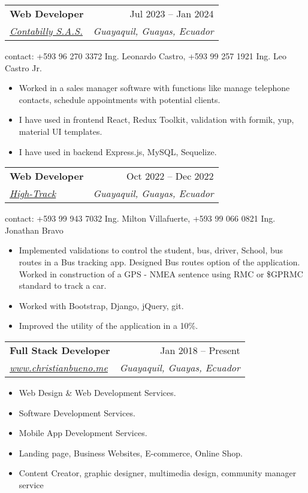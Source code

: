 \documentclass[a4paper,11pt]{article}
\makeatletter
\newcommand{\resumeItem}[1]{
  \item\small{#1}
}
\newcommand{\resumeItemListStart}{\begin{itemize}[rightmargin=0.11in]}
\newcommand{\resumeItemListEnd}{\end{itemize}}
\newcommand{\resumeQuadHeading}[4]{
  \item
  \begin{tabular*}{0.96\textwidth}[t]{l@{\extracolsep{\fill}}r}
    \textbf{#1} & #2 \\
    \textit{\small#3} & \textit{\small #4} \\
  \end{tabular*}
}
\makeatother
\begin{document}
\resumeQuadHeading{Web Developer}{Jul 2023 -- Jan 2024}
  {\href{}{\uline{Contabilly S.A.S.}}} {Guayaquil, Guayas, Ecuador}
  contact: +593 96 270 3372 Ing. Leonardo Castro, +593 99 257 1921 Ing. Leo Castro Jr.
    \resumeItemListStart{}
      \resumeItem{
      Worked in a sales manager software with functions like  manage telephone contacts, schedule appointments with potential clients.
      }
      \resumeItem{
      I have used in frontend React, Redux Toolkit, validation with formik, yup, material UI templates.
      }
      \resumeItem{
      I have used in backend Express.js, MySQL, Sequelize.
      }
    \resumeItemListEnd{}


\resumeQuadHeading{Web Developer}{Oct 2022 -- Dec 2022}
  {\href{https://high-track.com/}{\uline{High-Track}}} {Guayaquil, Guayas, Ecuador}
  contact: +593 99 943 7032 Ing. Milton Villafuerte, +593 99 066 0821 Ing. Jonathan Bravo
    \resumeItemListStart{}
      \resumeItem{
      Implemented validations to control the student, bus, driver, School, bus routes in a Bus tracking app. Designed Bus routes option of the application. Worked in construction of a GPS - NMEA sentence using RMC or \$GPRMC standard to track a car.
      }
      \resumeItem{
      Worked with Bootstrap, Django, jQuery, git.
      }
      \resumeItem{
      Improved the utility of the application in a 10\%.
      }
    \resumeItemListEnd{}
    
\resumeQuadHeading{Full Stack Developer}{Jan 2018 -- Present}
  {\href{https://christianbueno.me}{\uline{www.christianbueno.me}}}{Guayaquil, Guayas, Ecuador}
    \resumeItemListStart{}
      \resumeItem{Web Design \& Web Development Services.}
      \resumeItem{Software Development Services.}
      \resumeItem{Mobile App Development Services.}
      \resumeItem{Landing page, Business Websites, E-commerce, Online Shop.}
      \resumeItem{Content Creator, graphic designer, multimedia design, community manager service}
    \resumeItemListEnd{}
\end{document}
